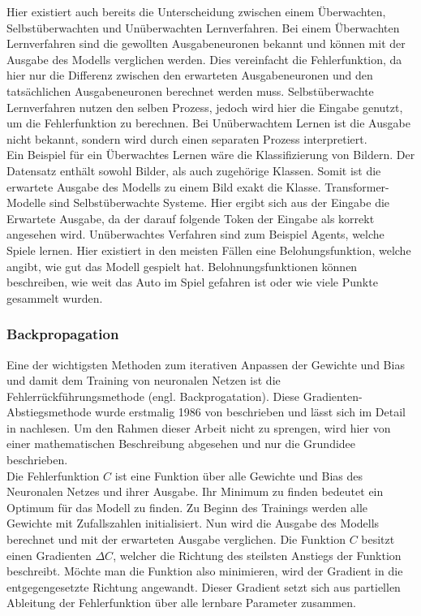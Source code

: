 Hier existiert auch bereits die Unterscheidung zwischen einem Überwachten, Selbstüberwachten und Unüberwachten Lernverfahren.
Bei einem Überwachten Lernverfahren sind die gewollten Ausgabeneuronen bekannt und können mit der Ausgabe des Modells verglichen werden.
Dies vereinfacht die Fehlerfunktion, da hier nur die Differenz zwischen den erwarteten Ausgabeneuronen und den tatsächlichen Ausgabeneuronen berechnet werden muss.
Selbstüberwachte Lernverfahren nutzen den selben Prozess, jedoch wird hier die Eingabe genutzt, um die Fehlerfunktion zu berechnen.
Bei Unüberwachtem Lernen ist die Ausgabe nicht bekannt, sondern wird durch einen separaten Prozess interpretiert.\\

Ein Beispiel für ein Überwachtes Lernen wäre die Klassifizierung von Bildern.
Der Datensatz enthält sowohl Bilder, als auch zugehörige Klassen.
Somit ist die erwartete Ausgabe des Modells zu einem Bild exakt die Klasse.
Transformer-Modelle sind Selbstüberwachte Systeme.
Hier ergibt sich aus der Eingabe die Erwartete Ausgabe, da der darauf folgende Token der Eingabe als korrekt angesehen wird.
Unüberwachtes Verfahren sind zum Beispiel Agents, welche Spiele lernen.
Hier existiert in den meisten Fällen eine Belohungsfunktion, welche angibt, wie gut das Modell gespielt hat.
Belohnungsfunktionen können beschreiben, wie weit das Auto im Spiel gefahren ist oder wie viele Punkte gesammelt wurden.\\

\subsubsection{Backpropagation}
Eine der wichtigsten Methoden zum iterativen Anpassen der Gewichte und Bias und damit dem Training von neuronalen Netzen ist die Fehlerrückführungsmethode (engl.
Backprogatation).
Diese Gradienten-Abstiegsmethode wurde erstmalig 1986 von \citet{backpropagation} beschrieben und lässt sich im Detail in \citet{neuronale-netze} nachlesen.
Um den Rahmen dieser Arbeit nicht zu sprengen, wird hier von einer mathematischen Beschreibung abgesehen und nur die Grundidee beschrieben.\\

Die Fehlerfunktion $C$ ist eine Funktion über alle Gewichte und Bias des Neuronalen Netzes und ihrer Ausgabe.
Ihr Minimum zu finden bedeutet ein Optimum für das Modell zu finden.
Zu Beginn des Trainings werden alle Gewichte mit Zufallszahlen initialisiert.
Nun wird die Ausgabe des Modells berechnet und mit der erwarteten Ausgabe verglichen.
Die Funktion $C$ besitzt einen Gradienten $\Delta C$, welcher die Richtung des steilsten Anstiegs der Funktion beschreibt.
Möchte man die Funktion also minimieren, wird der Gradient in die entgegengesetzte Richtung angewandt.
Dieser Gradient setzt sich aus partiellen Ableitung der Fehlerfunktion über alle lernbare Parameter zusammen.\\

